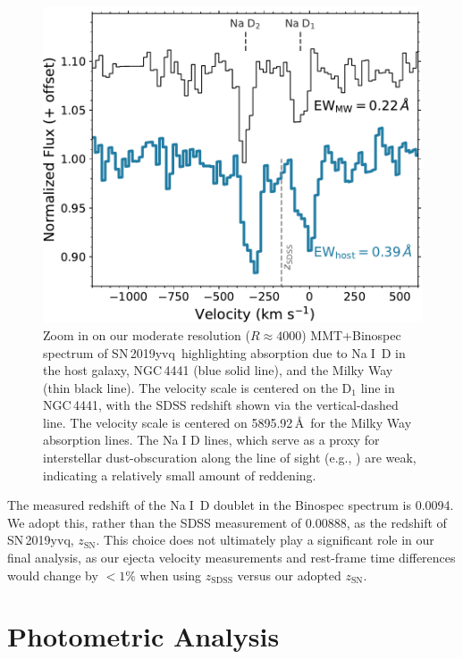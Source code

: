 \documentclass[twocolumn]{aastex63}
\def\ion#1#2{#1$\;${\footnotesize\rm{#2}}\relax}
\newcommand{\sn}{SN\,2019yvq}
\begin{document}
\begin{figure} \centering \includegraphics[width=\columnwidth]{./figures/NaD.pdf}
    \caption{Zoom in on our moderate resolution ($R \approx 4000$)
    MMT+Binospec spectrum of \sn\ highlighting absorption due to \ion{Na}{I}~D
    in the host galaxy, NGC\,4441 (blue solid line), and the Milky Way (thin
    black line). The velocity scale is centered on the D$_1$ line in
    NGC\,4441, with the SDSS redshift shown via the vertical-dashed line. The
    velocity scale is centered on 5895.92\,\AA\ for the Milky Way absorption
    lines. The \ion{Na}{I} D lines, which serve as a proxy for interstellar
    dust-obscuration along the line of sight (e.g.,
    \citealt{Poznanski12,Phillips13}) are weak, indicating a relatively small
    amount of reddening.}
    \label{fig:NaD}
\end{figure}

The measured redshift of the \ion{Na}{I}~D doublet in the Binospec spectrum is
0.0094. We adopt this, rather than the SDSS measurement of 0.00888, as the
redshift of \sn, $z_\mathrm{SN}$. This choice does not ultimately play a
significant role in our final analysis, as our ejecta velocity measurements
and rest-frame time differences would change by $<1\%$ when using
$z_\mathrm{SDSS}$ versus our adopted $z_\mathrm{SN}$.


\section{Photometric Analysis}\label{sec:phot}
\end{document}
